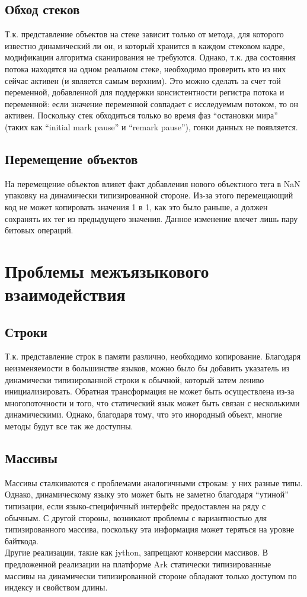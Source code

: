 \documentclass[times,specification,annotation]{itmo-student-thesis}
\begin{document}
\subsection{Обход стеков}
Т.к. представление объектов на стеке зависит только от метода, для которого известно динамический ли он, и который хранится в каждом стековом кадре, модификации алгоритма сканирования не требуются. Однако, т.к. два состояния потока находятся на одном реальном стеке, необходимо проверить кто из них сейчас активен (и является самым верхним). Это можно сделать за счет той переменной, добавленной для поддержки консистентности регистра потока и переменной: если значение переменной совпадает с исследуемым потоком, то он активен. Поскольку стек обходиться только во время фаз ``остановки мира'' (таких как ``initial mark pause'' и ``remark pause''), гонки данных не появляется.
\subsection{Перемещение объектов}
На перемещение объектов влияет факт добавления нового объектного тега в NaN упаковку на динамически типизированной стороне. Из-за этого перемещающий код не может копировать значения 1 в 1, как это было раньше, а должен сохранять их тег из предыдущего значения. Данное изменение влечет лишь пару битовых операций.


\section{Проблемы межъязыкового взаимодействия}
\subsection{Строки}
Т.к. представление строк в памяти различно, необходимо копирование. Благодаря неизменяемости в большинстве языков, можно было бы добавить указатель из динамически типизированной строки к обычной, который затем лениво инициализировать. Обратная трансформация не может быть осуществлена из-за многопоточности и того, что статический язык может быть связан с несколькими динамическими. Однако, благодаря тому, что это инородный объект, многие методы будут все так же доступны.

\subsection{Массивы}
Массивы сталкиваются с проблемами аналогичными строкам: у них разные типы. Однако, динамическому языку это может быть не заметно благодаря ``утиной'' типизации, если языко-специфичный интерфейс предоставлен на ряду с обычным. С другой стороны, возникают проблемы с вариантностью для типизированного массива, поскольку эта информация может теряться на уровне байткода.\\
Другие реализации, такие как jython, запрещают конверсии массивов. В предложенной реализации на платформе Ark статически типизированные массивы на динамически типизированной стороне обладают только доступом по индексу и свойством длины.
\end{document}
